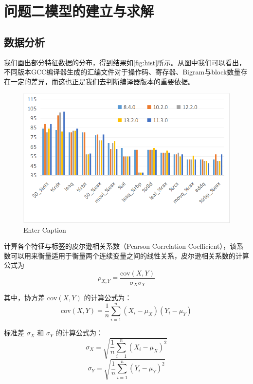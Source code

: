 \section{问题二模型的建立与求解}
  \subsection{数据分析}
  我们画出部分特征数据的分布，得到结果如\autoref{fig:hist}所示。从图中我们可以看出，不同版本GCC编译器生成的汇编文件对于操作码、寄存器、Bigram与block数量存在一定的差异，而这也正是我们去判断编译器版本的重要依据。
  \begin{figure}[H]
      \centering
      \includegraphics[width=1\linewidth]{figures/hist.png}
      \caption{Enter Caption}
      \label{fig:hist}
  \end{figure}

  
计算各个特征与标签的皮尔逊相关系数（Pearson Correlation Coefficient），该系数可以用来衡量适用于衡量两个连续变量之间的线性关系，皮尔逊相关系数的计算公式为
\begin{equation}
\rho_{X,Y} = \frac{\text{cov}(X, Y)}{\sigma_X \sigma_Y}
\label{eq:correlation}
\end{equation}

其中，协方差 \(\text{cov}(X, Y)\) 的计算公式为：
\begin{equation}
\text{cov}(X, Y) = \frac{1}{n} \sum_{i=1}^{n} (X_i - \mu_X)(Y_i - \mu_Y)
\label{eq:covariance}
\end{equation}

标准差 \(\sigma_X\) 和 \(\sigma_Y\) 的计算公式为：
\begin{equation}
\sigma_X = \sqrt{\frac{1}{n} \sum_{i=1}^{n} (X_i - \mu_X)^2}
\label{eq:stddev_x}
\end{equation}
\begin{equation}
\sigma_Y = \sqrt{\frac{1}{n} \sum_{i=1}^{n} (Y_i - \mu_Y)^2}
\label{eq:stddev_y}
\end{equation}

